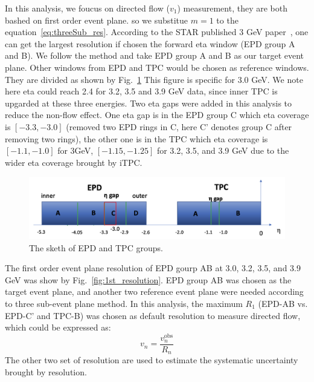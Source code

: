 In this analysis, we foucus on directed flow ($v_1$) measurement, they are both bashed on 
first order event plane. so we substitue $m=1$ to the equation~\ref{eq:threeSub_res}.
According to the STAR published 3 GeV paper~\cite{Abdallah_2022}, one can get the largest resolution if chosen the forward eta window (EPD group A and B).
We follow the method and take EPD group A and B as our target event plane. Other windows from EPD and TPC would be chosen as reference windows.
They are divided as shown by Fig.~\ref{fig:EPD_TPC_groups}
This figure is specific for 3.0 GeV. We note here eta could reach 2.4 for 3.2, 3.5 and 3.9 GeV data, since inner TPC is upgarded at these three energies.
Two eta gaps were added in this analysis to reduce the non-flow effect. 
One eta gap is in the EPD group C which eta coverage is $[-3.3, -3.0]$ (removed two EPD rings in C, here C' denotes group C after removing two rings), 
the other one is in the TPC which eta coverage is $[-1.1, -1.0]$ for 3GeV, $[-1.15, -1.25]$ for 3.2, 3.5, and 3.9 GeV due to the wider eta coverage brought by iTPC. 
\begin{figure}[hbt!]
\centering
\includegraphics[width=0.65\linewidth]{figures/chapter02/EPD_TPC_groups.png}
\caption{The sketh of EPD and TPC groups.}
\label{fig:EPD_TPC_groups}
\end{figure}



The first order event plane resolution of EPD gourp AB at 3.0, 3.2, 3.5, and 3.9 GeV was show by Fig.~\ref{fig:1st_resolution}.
EPD group AB was chosen as the target event plane, and another two reference event plane were needed according to three sub-event plane method.
In this analysis, the maximum $R_1$ (EPD-AB vs. EPD-C' and TPC-B) was chosen as default resolution to measure directed flow, which could be expressed as:
\begin{equation}
v_n=\frac{v_n^{\mathrm{obs}}}{R_n}
\label{eq:vn}
\end{equation}
The other two set of resolution are used to estimate the systematic uncertainty brought by resolution.

